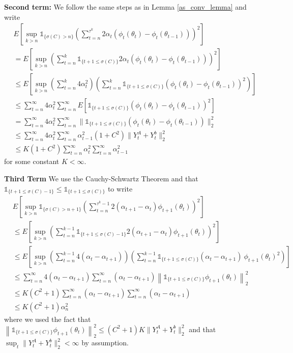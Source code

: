 \documentclass[11pt]{article}
\begin{document}
{\bf Second term:} We follow the same steps as in Lemma \ref{as_conv_lemma} and write 
\begin{align*}
&E\left[\sup_{k>n} \mathds{1}_{\{\sigma(C)>n\}} \left( \sum_{t=n}^{\tau^k}2\alpha_t \left(\phi_{t}(\theta_t)-\phi_{t}(\theta_{t-1})\right)\right)^2\right]\\
&=E\left[\sup_{k>n}  \left( \sum_{t=n}^{k}\mathds{1}_{\{t+1\leq\sigma(C)\}}2\alpha_t \left(\phi_{t}(\theta_t)-\phi_{t}(\theta_{t-1})\right)\right)^2\right]\\
&\leq E\left[\sup_{k>n}  \left( \sum_{t=n}^{k}4\alpha^2_t\right) \left( \sum_{t=n}^{k} \mathds{1}_{\{t+1\leq\sigma(C)\}}\left( \phi_{t}(\theta_t)-\phi_{t}(\theta_{t-1})\right)^2\right)\right]\\
&\leq    \sum_{t=n}^\infty 4\alpha_t^2 \sum_{t=n}^\infty E\left[ \mathds{1}_{\{ t+1\leq \sigma(C)\}} (\phi_t(\theta_t) - \phi_t(\theta_{t-1}))^2 \right]\\
&=  \sum_{t=n}^\infty4 \alpha_t^2 \sum_{t=n}^\infty \| \mathds{1}_{\{t+1\leq \sigma(C)\}}\left(\phi_t(\theta_t) -\phi_t(\theta_{t-1})\right)\|^2_2 \\
&\leq  \sum_{t=n}^\infty 4\alpha_t^2 \sum_{t=n}^\infty   \alpha^2_{t-1} (1+C^2)\|Y_t^A+Y_t^b\|^2_2\\
&\leq K (1+C^2) \sum_{t=n}^\infty \alpha_t^2 \sum_{t=n}^\infty   \alpha^2_{t-1} 
\end{align*}
for some constant $K<\infty$.


{\bf Third Term}
We use the Cauchy-Schwartz Theorem and that $\mathds{1}_{\{t+1\leq \sigma(C)-1\}} \leq \mathds{1}_{\{t+1\leq \sigma(C)\}} $ to write \begin{align*}
&E\left[\sup_{k>n} \mathds{1}_{\{\sigma(C)>n+1\}} \left( \sum_{t=n}^{\tau^k-1}2(\alpha_{t+1}-\alpha_t) \phi_{t+1}(\theta_t)\right)^2\right]\\
&\leq E\left[\sup_{k>n}  \left( \sum_{t=n}^{k-1} \mathds{1}_{\{t+1\leq \sigma(C)-1\}} 2(\alpha_{t+1}-\alpha_t) \phi_{t+1}(\theta_t)\right)^2  \right]\\
&\leq E\left[\sup_{k>n} \left(\sum_{t=n}^{k-1}  4(\alpha_{t}-\alpha_{t+1})\right) \left(\sum_{t=n}^{k-1} \mathds{1}_{\{t+1\leq \sigma(C)\}} (\alpha_{t}-\alpha_{t+1})\ \phi_{t+1}(\theta_t)^2  \right)\right]\\
&\leq \sum_{t=n}^{\infty}  4(\alpha_{t}-\alpha_{t+1}) \sum_{t=n}^{\infty} (\alpha_{t}-\alpha_{t+1}) \left\| \mathds{1}_{\{t+1\leq \sigma(C)\}} \phi_{t+1}(\theta_t) \right\|_2^2\\
&\leq K(C^2+1)\sum_{t=n}^{\infty}  (\alpha_{t}-\alpha_{t+1}) \sum_{t=n}^{\infty}   (\alpha_{t}-\alpha_{t+1}) \\
&\leq  K(C^2+1)\alpha_n^2
\end{align*}
where we used the fact that $\left\| \mathds{1}_{\{t+1\leq \sigma(C)\}} \phi_{t+1}(\theta_t) \right\|_2^2 \leq (C^2+1) K \|Y_t^A+Y_t^b\|_2^2$ and that $\sup_t  \|Y_t^A+Y_t^b\|_2^2 < \infty$ by assumption.
\end{document}
